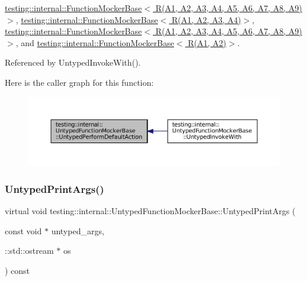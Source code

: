 \hyperlink{classtesting_1_1internal_1_1FunctionMockerBase_aed1c6248ba1b50437ee3a5f72c5f7bf3}{testing\+::internal\+::\+Function\+Mocker\+Base$<$ R(\+A1, A2, A3, A4, A5, A6, A7, A8, A9)$>$}, \hyperlink{classtesting_1_1internal_1_1FunctionMockerBase_aed1c6248ba1b50437ee3a5f72c5f7bf3}{testing\+::internal\+::\+Function\+Mocker\+Base$<$ R(\+A1, A2, A3, A4)$>$}, \hyperlink{classtesting_1_1internal_1_1FunctionMockerBase_aed1c6248ba1b50437ee3a5f72c5f7bf3}{testing\+::internal\+::\+Function\+Mocker\+Base$<$ R(\+A1, A2, A3, A4, A5, A6, A7, A8, A9) $>$}, and \hyperlink{classtesting_1_1internal_1_1FunctionMockerBase_aed1c6248ba1b50437ee3a5f72c5f7bf3}{testing\+::internal\+::\+Function\+Mocker\+Base$<$ R(\+A1, A2)$>$}.



Referenced by Untyped\+Invoke\+With().

Here is the caller graph for this function\+:
\nopagebreak
\begin{figure}[H]
\begin{center}
\leavevmode
\includegraphics[width=350pt]{classtesting_1_1internal_1_1UntypedFunctionMockerBase_a2cb149456cd559d5b0615f2310b235e3_icgraph}
\end{center}
\end{figure}
\mbox{\label{classtesting_1_1internal_1_1UntypedFunctionMockerBase_ae8c91f05fc90e66a84df49aae8de0d41}} 
\subsubsection{\texorpdfstring{Untyped\+Print\+Args()}{UntypedPrintArgs()}}
{\footnotesize\ttfamily virtual void testing\+::internal\+::\+Untyped\+Function\+Mocker\+Base\+::\+Untyped\+Print\+Args (\begin{DoxyParamCaption}\item[{const void $\ast$}]{untyped\+\_\+args,  }\item[{\+::std\+::ostream $\ast$}]{os }\end{DoxyParamCaption}) const\hspace{0.3cm}{\ttfamily [pure virtual]}}



